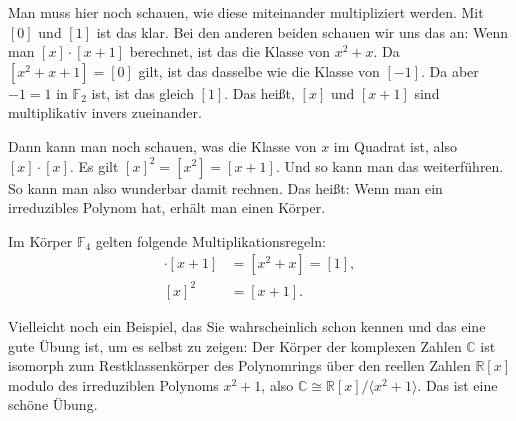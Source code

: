 \begin{spoken-clean}[01:00:12 - 01:02:59]
Man muss hier noch schauen, wie diese miteinander multipliziert werden. Mit $[0]$ und $[1]$ ist das klar. Bei den anderen beiden schauen wir uns das an: Wenn man $[x] \cdot [x+1]$ berechnet, ist das die Klasse von $x^2 + x$. Da $[x^2 + x + 1] = [0]$ gilt, ist das dasselbe wie die Klasse von $[-1]$. Da aber $-1 = 1$ in $\mathbb{F}_2$ ist, ist das gleich $[1]$. Das heißt, $[x]$ und $[x+1]$ sind multiplikativ invers zueinander.

Dann kann man noch schauen, was die Klasse von $x$ im Quadrat ist, also $[x] \cdot [x]$. Es gilt $[x]^2 = [x^2] = [x+1]$. Und so kann man das weiterführen. So kann man also wunderbar damit rechnen. Das heißt: Wenn man ein irreduzibles Polynom hat, erhält man einen Körper.
\end{spoken-clean}

\begin{math-stroke}
Im Körper $\mathbb{F}_4$ gelten folgende Multiplikationsregeln:
\begin{align*}
[x] \cdot [x+1] &= [x^2 + x] = [1], \\
[x]^2 &= [x+1].
\end{align*}
\end{math-stroke}

\begin{spoken-clean}[01:02:59 - 01:05:39]
Vielleicht noch ein Beispiel, das Sie wahrscheinlich schon kennen und das eine gute Übung ist, um es selbst zu zeigen: Der Körper der komplexen Zahlen $\mathbb{C}$ ist isomorph zum Restklassenkörper des Polynomrings über den reellen Zahlen $\mathbb{R}[x]$ modulo des irreduziblen Polynoms $x^2 + 1$, also $\mathbb{C} \cong \mathbb{R}[x]/\langle x^2 + 1 \rangle$. Das ist eine schöne Übung.
\end{spoken-clean}

\begin{math-stroke}
\end{math-stroke}

